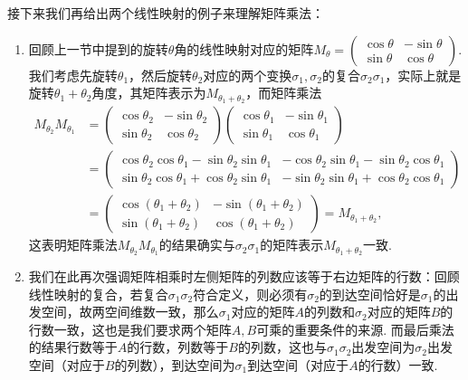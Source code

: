 接下来我们再给出两个线性映射的例子来理解矩阵乘法：
\begin{enumerate}
    \item 回顾上一节中提到的旋转$\theta$角的线性映射对应的矩阵$M_{\theta}=\begin{pmatrix}
                  \cos\theta & -\sin\theta \\
                  \sin\theta & \cos\theta
              \end{pmatrix}$. 我们考虑先旋转$\theta_1$，然后旋转$\theta_2$对应的两个变换$\sigma_1,\sigma_2$的复合$\sigma_2\sigma_1$，实际上就是旋转$\theta_1+\theta_2$角度，其矩阵表示为$M_{\theta_1+\theta_2}$，而矩阵乘法
          \begin{align*}
              M_{\theta_2}M_{\theta_1}
               & =\begin{pmatrix}
                      \cos\theta_2 & -\sin\theta_2 \\
                      \sin\theta_2 & \cos\theta_2
                  \end{pmatrix}\begin{pmatrix}
                                   \cos\theta_1 & -\sin\theta_1 \\
                                   \sin\theta_1 & \cos\theta_1
                               \end{pmatrix} \\
               & =\begin{pmatrix}
                      \cos\theta_2\cos\theta_1-\sin\theta_2\sin\theta_1 & -\cos\theta_2\sin\theta_1-\sin\theta_2\cos\theta_1 \\
                      \sin\theta_2\cos\theta_1+\cos\theta_2\sin\theta_1 & -\sin\theta_2\sin\theta_1+\cos\theta_2\cos\theta_1
                  \end{pmatrix} \\
               & =\begin{pmatrix}
                      \cos(\theta_1+\theta_2) & -\sin(\theta_1+\theta_2) \\
                      \sin(\theta_1+\theta_2) & \cos(\theta_1+\theta_2)
                  \end{pmatrix}=M_{\theta_1+\theta_2},
          \end{align*}
          这表明矩阵乘法$M_{\theta_2}M_{\theta_1}$的结果确实与$\sigma_2\sigma_1$的矩阵表示$M_{\theta_1+\theta_2}$一致.

    \item 我们在此再次强调矩阵相乘时左侧矩阵的列数应该等于右边矩阵的行数：回顾线性映射的复合，若复合$\sigma_1\sigma_2$符合定义，则必须有$\sigma_2$的到达空间恰好是$\sigma_1$的出发空间，故两空间维数一致，那么$\sigma_1$对应的矩阵$A$的列数和$\sigma_2$对应的矩阵$B$的行数一致，这也是我们要求两个矩阵$A,B$可乘的重要条件的来源. 而最后乘法的结果行数等于$A$的行数，列数等于$B$的列数，这也与$\sigma_1\sigma_2$出发空间为$\sigma_2$出发空间（对应于$B$的列数），到达空间为$\sigma_1$到达空间（对应于$A$的行数）一致.
\end{enumerate}

